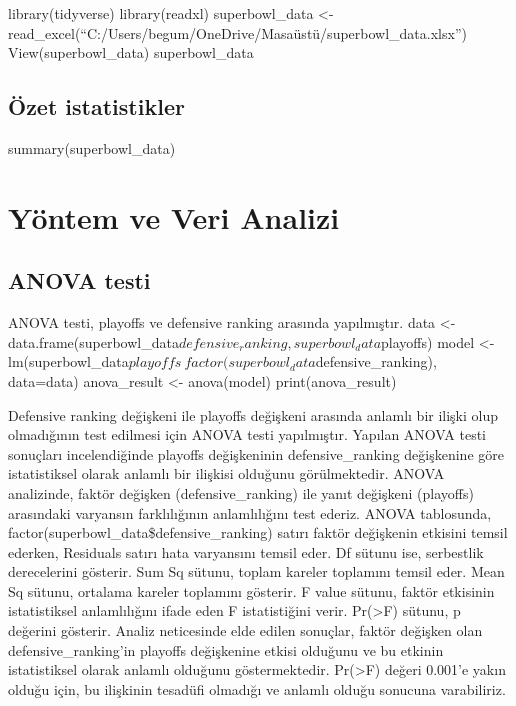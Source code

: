 \documentclass[
  12pt,
]{article}
\begin{document}
library(tidyverse)
library(readxl)
superbowl\_data \textless- read\_excel(``C:/Users/begum/OneDrive/Masaüstü/superbowl\_data.xlsx'')
View(superbowl\_data)
superbowl\_data

\hypertarget{uxf6zet-istatistikler}{%
\subsection{Özet istatistikler}\label{uxf6zet-istatistikler}}

summary(superbowl\_data)

\hypertarget{yuxf6ntem-ve-veri-analizi}{%
\section{Yöntem ve Veri Analizi}\label{yuxf6ntem-ve-veri-analizi}}

\hypertarget{anova-testi}{%
\subsection{ANOVA testi}\label{anova-testi}}

ANOVA testi, playoffs ve defensive ranking arasında yapılmıştır.
data \textless- data.frame(superbowl\_data\(defensive_ranking, superbowl_data\)playoffs)
model \textless- lm(superbowl\_data\(playoffs ~ factor(superbowl_data\)defensive\_ranking), data=data)
anova\_result \textless- anova(model)
print(anova\_result)

Defensive ranking değişkeni ile playoffs değişkeni arasında anlamlı bir ilişki olup olmadığının test edilmesi için ANOVA testi yapılmıştır. Yapılan ANOVA testi sonuçları incelendiğinde playoffs değişkeninin defensive\_ranking değişkenine göre istatistiksel olarak anlamlı bir ilişkisi olduğunu görülmektedir. ANOVA analizinde, faktör değişken (defensive\_ranking) ile yanıt değişkeni (playoffs) arasındaki varyansın farklılığının anlamlılığını test ederiz. ANOVA tablosunda, factor(superbowl\_data\$defensive\_ranking) satırı faktör değişkenin etkisini temsil ederken, Residuals satırı hata varyansını temsil eder. Df sütunu ise, serbestlik derecelerini gösterir. Sum Sq sütunu, toplam kareler toplamını temsil eder. Mean Sq sütunu, ortalama kareler toplamını gösterir. F value sütunu, faktör etkisinin istatistiksel anlamlılığını ifade eden F istatistiğini verir. Pr(\textgreater F) sütunu, p değerini gösterir. Analiz neticesinde elde edilen sonuçlar, faktör değişken olan defensive\_ranking'in playoffs değişkenine etkisi olduğunu ve bu etkinin istatistiksel olarak anlamlı olduğunu göstermektedir. Pr(\textgreater F) değeri 0.001'e yakın olduğu için, bu ilişkinin tesadüfi olmadığı ve anlamlı olduğu sonucuna varabiliriz.
\end{document}
